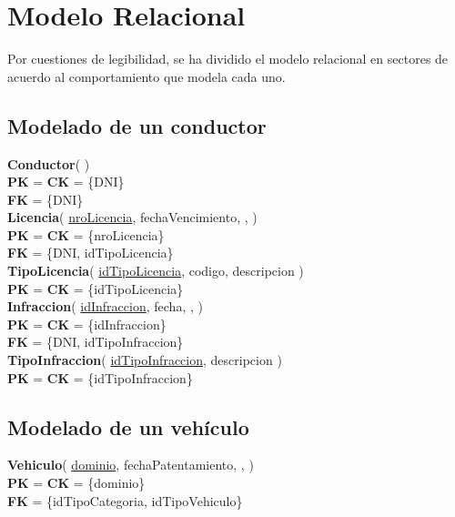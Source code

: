 \section{Modelo Relacional}
\small

Por cuestiones de legibilidad, se ha dividido el modelo relacional en sectores
    de acuerdo al comportamiento que modela cada uno.


\subsection{Modelado de un conductor}

\textbf{Conductor}(
)\\
\textbf{PK} = \textbf{CK} = \{DNI\}\\
\textbf{FK} = \{DNI\}\\

\textbf{Licencia}(
    \uline{nroLicencia},
    fechaVencimiento,
    ,
)\\
\textbf{PK} = \textbf{CK} = \{nroLicencia\}\\
\textbf{FK} = \{DNI, idTipoLicencia\}\\

\textbf{TipoLicencia}(
    \uline{idTipoLicencia},
    codigo,
    descripcion
)\\
\textbf{PK} = \textbf{CK} = \{idTipoLicencia\}\\

\textbf{Infraccion}(
    \uline{idInfraccion},
    fecha,
    ,
)\\
\textbf{PK} = \textbf{CK} = \{idInfraccion\}\\
\textbf{FK} = \{DNI, idTipoInfraccion\}\\

\textbf{TipoInfraccion}(
    \uline{idTipoInfraccion},
    descripcion
)\\
\textbf{PK} = \textbf{CK} = \{idTipoInfraccion\}\\

\subsection{Modelado de un vehículo}

\textbf{Vehiculo}(
    \uline{dominio},
    fechaPatentamiento,
    ,
)\\
\textbf{PK} = \textbf{CK} = \{dominio\}\\
\textbf{FK} = \{idTipoCategoria, idTipoVehiculo\}\\

